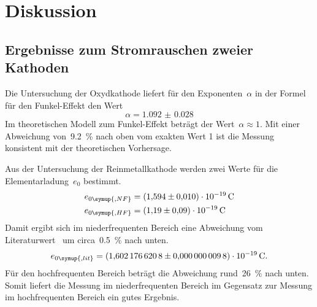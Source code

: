 \section{Diskussion}
\label{sec:diskussion}

\subsection{Ergebnisse zum Stromrauschen zweier Kathoden}

Die Untersuchung der Oxydkathode liefert für den Exponenten~$\alpha$ in der
Formel für den Funkel-Effekt den Wert
%
\begin{equation}
  \alpha=\num{1.092(28)}
\end{equation}
%
Im theoretischen Modell zum Funkel-Effekt beträgt der Wert~$\alpha\approx 1$.
Mit einer Abweichung von~\SI{9.2}{\percent} nach oben vom exakten Wert 1 ist die
Messung konsistent mit der theoretischen Vorhersage.

Aus der Untersuchung der Reinmetallkathode werden zwei Werte für die
Elementarladung~$e_0$ bestimmt.
%
\begin{align}
  e_{0\symup{, NF}}&=\SI{1.594(10)e-19}{\coulomb} \\
  e_{0\symup{, HF}}&=\SI{1.19(9)e-19}{\coulomb}
\end{align}
%
Damit ergibt sich im niederfrequenten Bereich eine Abweichung vom
Literaturwert~\cite{CODATA} um circa~\SI{0.5}{\percent} nach unten.
%
\begin{equation}
  e_{0\symup{, lit}}=\SI{1.6021766208(98)e-19}{\coulomb}.
\end{equation}
%
Für den hochfrequenten Bereich beträgt die Abweichung rund~\SI{26}{\percent}
nach unten. Somit liefert die Messung im niederfrequenten Bereich im Gegensatz
zur Messung im hochfrequenten Bereich ein gutes Ergebnis.
%
\nocite{V57}
